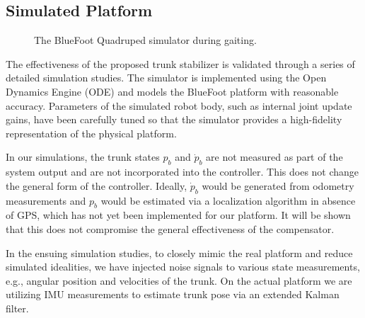 

\subsection{Simulated Platform}

	\begin{figure}[b!]\centering
		\vspace{-5mm}
		\caption{ The BlueFoot Quadruped simulator during gaiting. }
		\label{fig::bluefoot}
	\end{figure}
The effectiveness of the proposed trunk stabilizer is validated through a series of detailed simulation studies. 
The simulator is implemented using the Open Dynamics Engine (ODE) \cite{OpenDynamicsEngine} and models the BlueFoot platform with 
reasonable accuracy. Parameters of the simulated robot body, such as internal joint update
gains, have been carefully tuned so that the simulator provides a high-fidelity representation of the 
physical platform.

In our simulations, the trunk states $p_{b}$ and $\dot{p}_{b}$ are not measured as part of the system output and
are not incorporated into the controller. This does not change the general form of the controller. Ideally, $\dot{p}_{b}$ 
would be generated from odometry measurements and ${p}_{b}$ would be estimated via a localization algorithm in absence of GPS, which 
has not yet been implemented for our platform. It will be shown that this does not compromise the general effectiveness 
of the compensator.

In the ensuing simulation studies, to closely mimic  the real platform and reduce simulated idealities, we have injected noise
signals to various state measurements, e.g., angular position and velocities of the trunk. On the actual platform
we are utilizing IMU measurements to estimate trunk pose via an extended Kalman filter.


